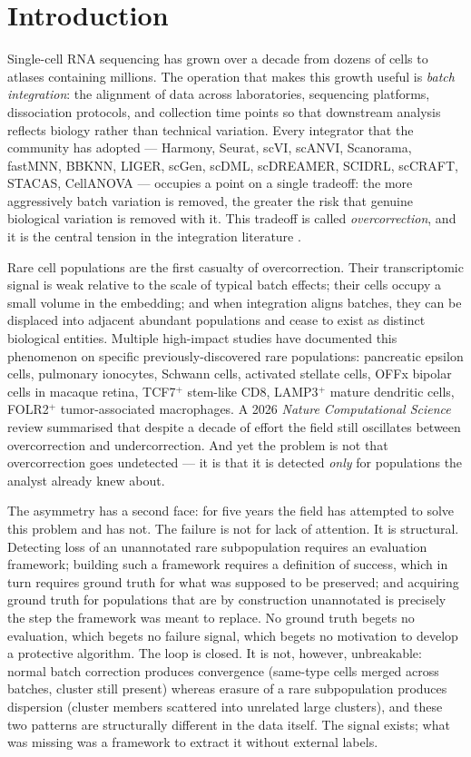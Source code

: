 \section{Introduction}

Single-cell RNA sequencing has grown over a decade from dozens of cells to atlases containing millions. The operation that makes this growth useful is \emph{batch integration}: the alignment of data across laboratories, sequencing platforms, dissociation protocols, and collection time points so that downstream analysis reflects biology rather than technical variation. Every integrator that the community has adopted --- Harmony, Seurat, scVI, scANVI, Scanorama, fastMNN, BBKNN, LIGER, scGen, scDML, scDREAMER, SCIDRL, scCRAFT, STACAS, CellANOVA --- occupies a point on a single tradeoff: the more aggressively batch variation is removed, the greater the risk that genuine biological variation is removed with it. This tradeoff is called \emph{overcorrection}, and it is the central tension in the integration literature \citep{scDML2023,scDREAMER2023,SCIDRL2022,scCRAFT2025,STACAS2024,CellANOVA2024,RBET2025,scIB-E2025}.

Rare cell populations are the first casualty of overcorrection. Their transcriptomic signal is weak relative to the scale of typical batch effects; their cells occupy a small volume in the embedding; and when integration aligns batches, they can be displaced into adjacent abundant populations and cease to exist as distinct biological entities. Multiple high-impact studies have documented this phenomenon on specific previously-discovered rare populations: pancreatic epsilon cells, pulmonary ionocytes, Schwann cells, activated stellate cells, OFFx bipolar cells in macaque retina, TCF7$^+$ stem-like CD8, LAMP3$^+$ mature dendritic cells, FOLR2$^+$ tumor-associated macrophages. A 2026 \emph{Nature Computational Science} review summarised that despite a decade of effort the field still oscillates between overcorrection and undercorrection. And yet the problem is not that overcorrection goes undetected --- it is that it is detected \emph{only} for populations the analyst already knew about.

The asymmetry has a second face: for five years the field has attempted to solve this problem and has not.  The failure is not for lack of attention.  It is structural.  Detecting loss of an unannotated rare subpopulation requires an evaluation framework; building such a framework requires a definition of success, which in turn requires ground truth for what was supposed to be preserved; and acquiring ground truth for populations that are by construction unannotated is precisely the step the framework was meant to replace.  No ground truth begets no evaluation, which begets no failure signal, which begets no motivation to develop a protective algorithm.  The loop is closed.  It is not, however, unbreakable: normal batch correction produces convergence (same-type cells merged across batches, cluster still present) whereas erasure of a rare subpopulation produces dispersion (cluster members scattered into unrelated large clusters), and these two patterns are structurally different in the data itself.  The signal exists; what was missing was a framework to extract it without external labels.

